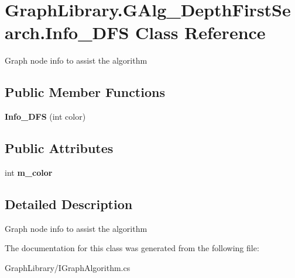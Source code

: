 \hypertarget{class_graph_library_1_1_g_alg___depth_first_search_1_1_info___d_f_s}{}\section{Graph\+Library.\+G\+Alg\+\_\+\+Depth\+First\+Search.\+Info\+\_\+\+D\+F\+S Class Reference}
\label{class_graph_library_1_1_g_alg___depth_first_search_1_1_info___d_f_s}


Graph node info to assist the algorithm  


\subsection*{Public Member Functions}
\begin{DoxyCompactItemize}
\item 
\hypertarget{class_graph_library_1_1_g_alg___depth_first_search_1_1_info___d_f_s_acfc3137a81072b688376a28489ac9bd1}{}{\bfseries Info\+\_\+\+D\+F\+S} (int color)\label{class_graph_library_1_1_g_alg___depth_first_search_1_1_info___d_f_s_acfc3137a81072b688376a28489ac9bd1}

\end{DoxyCompactItemize}
\subsection*{Public Attributes}
\begin{DoxyCompactItemize}
\item 
\hypertarget{class_graph_library_1_1_g_alg___depth_first_search_1_1_info___d_f_s_ac97ba75b70bdf9ba2abee1cccb3e0554}{}int {\bfseries m\+\_\+color}\label{class_graph_library_1_1_g_alg___depth_first_search_1_1_info___d_f_s_ac97ba75b70bdf9ba2abee1cccb3e0554}

\end{DoxyCompactItemize}


\subsection{Detailed Description}
Graph node info to assist the algorithm 



The documentation for this class was generated from the following file\+:\begin{DoxyCompactItemize}
\item 
Graph\+Library/I\+Graph\+Algorithm.\+cs\end{DoxyCompactItemize}
